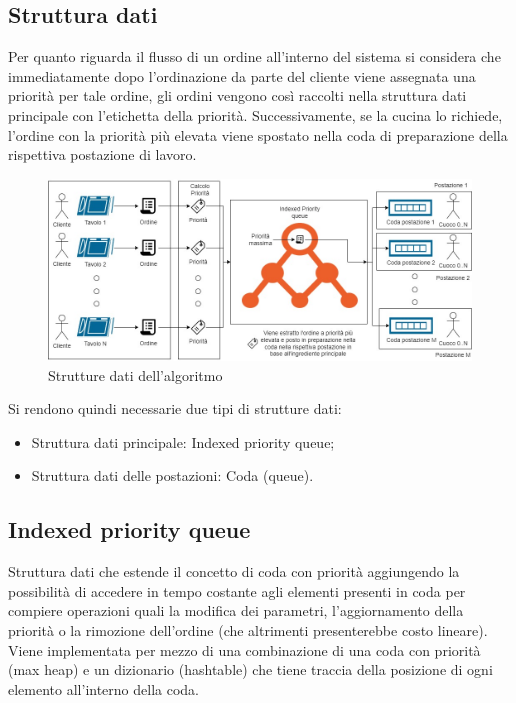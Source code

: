 \subsection{Struttura dati}
Per quanto riguarda il flusso di un ordine all’interno del sistema si considera che immediatamente dopo l’ordinazione da parte del cliente viene assegnata una priorità per tale ordine, gli ordini vengono così raccolti nella struttura dati principale con l’etichetta della priorità. Successivamente, se la cucina lo richiede, l'ordine con la priorità più elevata viene spostato nella coda di preparazione della rispettiva postazione di lavoro.

\begin{figure}[htbp]
	\centering
	\includegraphics[scale=0.4]{iterazione2/images/Algoritmo_struttura.jpg}
	\caption{Strutture dati dell'algoritmo\label{fig:algoritmo_struttura}}
\end{figure}

Si rendono quindi necessarie due tipi di strutture dati:
\begin{itemize}
	\item Struttura dati principale: Indexed priority queue;
	\item Struttura dati delle postazioni: Coda (queue).
\end{itemize}

\subsection*{Indexed priority queue}
Struttura dati che estende il concetto di coda con priorità aggiungendo la possibilità di accedere in tempo costante agli elementi presenti in coda per compiere operazioni quali la modifica dei parametri, l’aggiornamento della priorità o la rimozione dell’ordine (che altrimenti presenterebbe costo lineare).
Viene implementata per mezzo di una combinazione di una coda con priorità (max heap) e un dizionario (hashtable) che tiene traccia della posizione di ogni elemento all'interno della coda.

